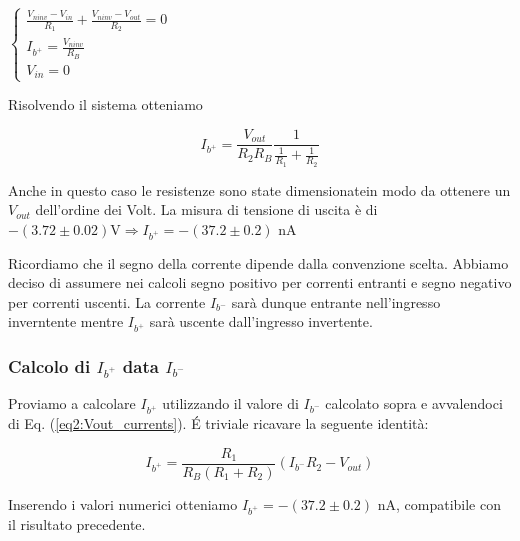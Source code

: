 $\begin{cases}\frac{V_{ninv} - V_{in}}{R_1} + \frac{V_{ninv}-V_{out}}{R_2}=0 \\ I_{b^+}=\frac{V_{ninv}}{R_B}\\ V_{in}=0 \end{cases}$

Risolvendo il sistema otteniamo


\begin{equation}
I_{b^+}=\frac{V_{out}}{R_2 R_B}\frac{1}{\frac{1}{R_1}+\frac{1}{R_2}}
\label{eq2:corrente_noninv}
\end{equation}

Anche in questo caso le resistenze sono state dimensionatein modo da ottenere un $V_{out}$ dell'ordine dei Volt. La misura di tensione di uscita è di $-(3.72 \pm 0.02) \si{\volt} \Rightarrow I_{b^+} = - (37.2 \pm 0.2)$ \si{\nano\ampere}

Ricordiamo che il segno della corrente dipende dalla convenzione scelta. Abbiamo deciso di assumere nei calcoli segno positivo per correnti entranti e segno negativo per correnti uscenti. La corrente $I_{b^-}$ sarà dunque entrante nell'ingresso inverntente mentre $I_{b^+}$ sarà uscente dall'ingresso invertente.


\subsubsection*{Calcolo di $I_{b^+}$ data $I_{b^-}$}

Proviamo a calcolare $I_{b^+}$ utilizzando il valore di $I_{b^-}$ calcolato sopra e avvalendoci di Eq. (\ref{eq2:Vout_currents}). \'E triviale ricavare la seguente identità: 

$$I_{b^+} = \frac{R_1}{R_B(R_1+R_2)}(I_{b^-} R_2-V_{out})$$

Inserendo i valori numerici otteniamo $I_{b^+} = - (37.2 \pm 0.2)$ \si{\nano\ampere}, compatibile con il risultato precedente.


 
